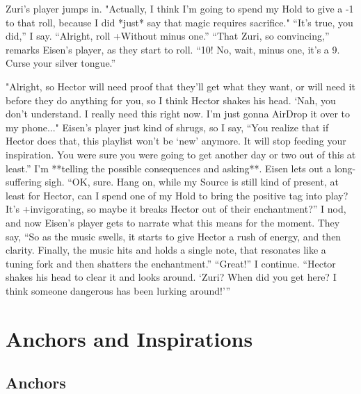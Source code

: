 \documentclass[
  oneside,
  statementpaper,
  9pt]{memoir}
\begin{document}
\begin{MC}
Zuri’s player jumps in. "Actually, I think I’m going to spend my Hold to give a -1 to that roll, because I did *just* say that magic requires sacrifice." “It’s true, you did,” I say. “Alright, roll +Without minus one.” “That Zuri, so convincing,” remarks Eisen’s player, as they start to roll. “10! No, wait, minus one, it’s a 9. Curse your silver tongue.”

"Alright, so Hector will need proof that they’ll get what they want, or will need it before they do anything for you, so I think Hector shakes his head. ‘Nah, you don’t understand. I really need this right now. I’m just gonna AirDrop it over to my phone..." Eisen’s player just kind of shrugs, so I say, “You realize that if Hector does that, this playlist won’t be ‘new’ anymore. It will stop feeding your inspiration. You were sure you were going to get another day or two out of this at least.” I’m **telling the possible consequences and asking**. Eisen lets out a long-suffering sigh. “OK, sure. Hang on, while my Source is still kind of present, at least for Hector, can I spend one of my Hold to bring the positive tag into play? It’s +invigorating, so maybe it breaks Hector out of their enchantment?” I nod, and now Eisen’s player gets to narrate what this means for the moment. They say, “So as the music swells, it starts to give Hector a rush of energy, and then clarity. Finally, the music hits and holds a single note, that resonates like a tuning fork and then shatters the enchantment.” “Great!” I continue. “Hector shakes his head to clear it and looks around. ‘Zuri? When did you get here? I think someone dangerous has been lurking around!’”

\end{MC}

\newpage

\label{Anchors and Inspirations chapter}

\hypertarget{anchors-and-inspirations}{%
\chapter{Anchors and Inspirations}\label{anchors-and-inspirations}}

\hypertarget{anchors-1}{%
\section{Anchors}\label{anchors-1}}
\end{document}
